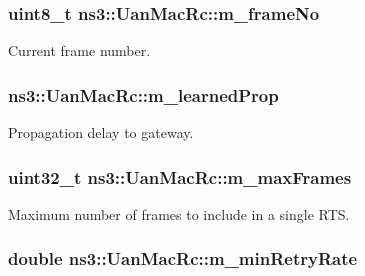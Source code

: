 \subsubsection[{\texorpdfstring{m\+\_\+frame\+No}{m_frameNo}}]{\setlength{\rightskip}{0pt plus 5cm}uint8\+\_\+t ns3\+::\+Uan\+Mac\+Rc\+::m\+\_\+frame\+No\hspace{0.3cm}{\ttfamily [private]}}\hypertarget{classns3_1_1UanMacRc_a3ff882a28b30031c90ce3242eb2d2dab}{}\label{classns3_1_1UanMacRc_a3ff882a28b30031c90ce3242eb2d2dab}


Current frame number. 

\subsubsection[{\texorpdfstring{m\+\_\+learned\+Prop}{m_learnedProp}}]{ ns3\+::\+Uan\+Mac\+Rc\+::m\+\_\+learned\+Prop\hspace{0.3cm}{\ttfamily [private]}}\hypertarget{classns3_1_1UanMacRc_a96cb22a43f018604074c8e73e711e9d7}{}\label{classns3_1_1UanMacRc_a96cb22a43f018604074c8e73e711e9d7}


Propagation delay to gateway. 

\subsubsection[{\texorpdfstring{m\+\_\+max\+Frames}{m_maxFrames}}]{\setlength{\rightskip}{0pt plus 5cm}uint32\+\_\+t ns3\+::\+Uan\+Mac\+Rc\+::m\+\_\+max\+Frames\hspace{0.3cm}{\ttfamily [private]}}\hypertarget{classns3_1_1UanMacRc_ad5bf316ed55590834c10630bb5b7740d}{}\label{classns3_1_1UanMacRc_ad5bf316ed55590834c10630bb5b7740d}


Maximum number of frames to include in a single R\+TS. 

\subsubsection[{\texorpdfstring{m\+\_\+min\+Retry\+Rate}{m_minRetryRate}}]{\setlength{\rightskip}{0pt plus 5cm}double ns3\+::\+Uan\+Mac\+Rc\+::m\+\_\+min\+Retry\+Rate\hspace{0.3cm}{\ttfamily [private]}}\hypertarget{classns3_1_1UanMacRc_a52a16612a3223b250f3e2f8a0941eb6f}{}\label{classns3_1_1UanMacRc_a52a16612a3223b250f3e2f8a0941eb6f}


